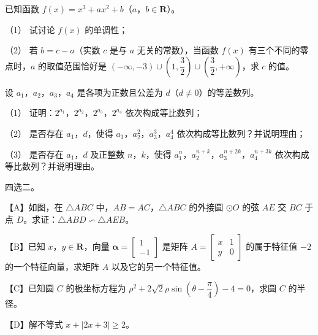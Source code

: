 \begin{question}
已知函数 \(f(x)=x^{3}+ax^{2}+b\)（\(a\)，\(b\in\mathbf{R}\)）。

（1） 试讨论 \(f(x)\) 的单调性；

（2） 若 \(b=c-a\)（实数 \(c\) 是与 \(a\) 无关的常数），当函数 \(f(x)\) 有三个不同的零点时，\(a\) 的取值范围恰好是 \((-\infty,-3)\cup\left(1,\dfrac{3}{2}\right)\cup\left(\dfrac{3}{2},+\infty\right)\)，求 \(c\) 的值。

\end{question}
\begin{question}
设 \(a_{1}\)，\(a_{2}\)，\(a_{3}\)，\(a_{4}\) 是各项为正数且公差为 \(d\)（\(d\neq 0\)）的等差数列。

（1） 证明：\(2^{a_{1}}\)，\(2^{a_{2}}\)，\(2^{a_{3}}\)，\(2^{a_{4}}\) 依次构成等比数列；

（2） 是否存在 \(a_{1}\)，\(d\)，使得 \(a_{1}\)，\(a_{2}^{2}\)，\(a_{3}^{3}\)，\(a_{4}^{4}\) 依次构成等比数列？并说明理由；

（3） 是否存在 \(a_{1}\)，\(d\) 及正整数 \(n\)，\(k\)，使得 \(a_{1}^{n}\)，\(a_{2}^{n+k}\)，\(a_{3}^{n+2k}\)，\(a_{4}^{n+3k}\) 依次构成等比数列？并说明理由。

\Needspace{0.4\textheight}
\end{question}
\begin{question}
四选二。

【A】如图，在 \(\triangle ABC\) 中，\(AB=AC\)，\(\triangle ABC\) 的外接圆 \(\odot O\) 的弦 \(AE\) 交 \(BC\) 于点 \(D\)。求证：\(\triangle ABD\backsim\triangle AEB\)。
\nopagebreak[4]
\begin{center}\end{center}
\nopagebreak[4]
【B】已知 \(x\)，\(y\in\mathbf{R}\)，向量 \(\boldsymbol\alpha=\begin{bmatrix}1\\-1\end{bmatrix}\) 是矩阵 $A=\begin{bmatrix}x&1\\y&0\end{bmatrix}$ 的属于特征值 \(-2\) 的一个特征向量，求矩阵 \(A\) 以及它的另一个特征值。

【C】已知圆 \(C\) 的极坐标方程为 \(\rho^{2}+2\sqrt{2}\rho\sin\left(\theta-\dfrac{\pi}{4}\right)-4=0\)，求圆 \(C\) 的半径。

【D】解不等式 \(x+|2x+3|\geqslant 2\)。

\Needspace{0.4\textheight}
\end{question}
